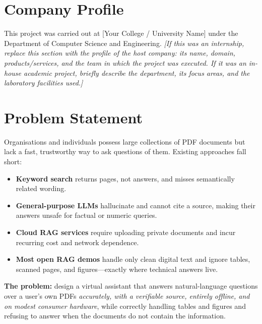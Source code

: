 \documentclass[12pt,a4paper]{report}
\newcommand{\InstituteName}{[Your College / University Name]}
\newcommand{\DeptName}{Department of Computer Science and Engineering}
\begin{document}
\section{Company Profile}
This project was carried out at \InstituteName{} under the \DeptName.
\textit{[If this was an internship, replace this section with the profile of the
host company: its name, domain, products/services, and the team in which the
project was executed. If it was an in-house academic project, briefly describe
the department, its focus areas, and the laboratory facilities used.]}

\section{Problem Statement}
Organisations and individuals possess large collections of PDF documents but lack
a fast, trustworthy way to ask questions of them. Existing approaches fall short:

\begin{itemize}[leftmargin=1.4em]
  \item \textbf{Keyword search} returns pages, not answers, and misses
        semantically related wording.
  \item \textbf{General-purpose LLMs} hallucinate and cannot cite a source,
        making their answers unsafe for factual or numeric queries.
  \item \textbf{Cloud RAG services} require uploading private documents and incur
        recurring cost and network dependence.
  \item \textbf{Most open RAG demos} handle only clean digital text and ignore
        tables, scanned pages, and figures---exactly where technical answers live.
\end{itemize}

\textbf{The problem:} design a virtual assistant that answers natural-language
questions over a user's own PDFs \emph{accurately, with a verifiable source,
entirely offline, and on modest consumer hardware}, while correctly handling
tables and figures and refusing to answer when the documents do not contain the
information.
\end{document}
